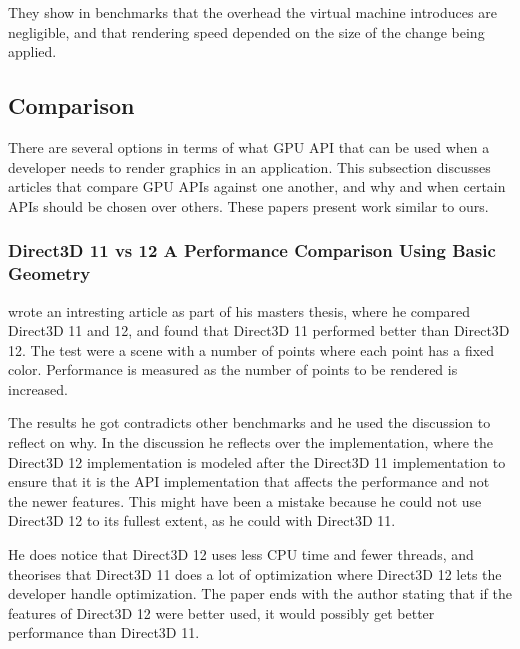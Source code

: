 They show in benchmarks that the overhead the virtual machine introduces are negligible, and that rendering speed depended on the size of the change being applied. 

\subsection{Comparison} 
There are several options in terms of what \gls{GPU} \gls{API} that can be used when a developer needs to render graphics in an application.
This subsection discusses articles that compare \gls{GPU} \glspl{API} against one another, and why and when certain \glspl{API} should be chosen over others.
These papers present work similar to ours.

\subsubsection{Direct3D 11 vs 12 A Performance Comparison Using Basic Geometry}

\citet{2016_direct3d} wrote an intresting article as part of his masters thesis, where he compared Direct3D 11 and 12, and found that Direct3D 11 performed better than Direct3D 12.
The test were a scene with a number of points where each point has a fixed color.
Performance is measured as the number of points to be rendered is increased.

The results he got contradicts other benchmarks and he used the discussion to reflect on why.
In the discussion he reflects over the implementation, where the Direct3D 12 implementation is modeled after the Direct3D 11 implementation to ensure that it is the \gls{API} implementation that affects the performance and not the newer features.
This might have been a mistake because he could not use Direct3D 12 to its fullest extent, as he could with Direct3D 11.

He does notice that Direct3D 12 uses less \gls{CPU} time and fewer threads, and theorises that Direct3D 11 does a lot of optimization where Direct3D 12 lets the developer handle optimization.
The paper ends with the author stating that if the features of Direct3D 12 were better used, it would possibly get better performance than Direct3D 11. 

